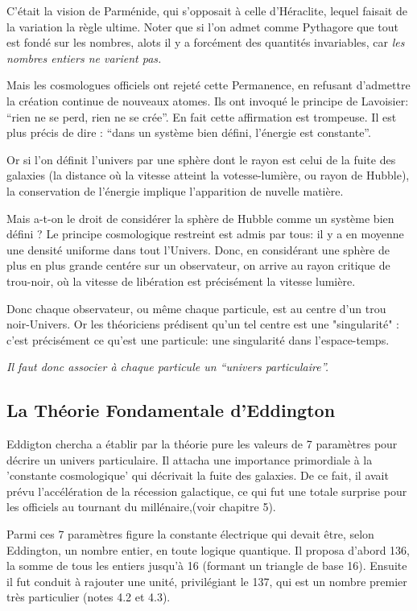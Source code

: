 \documentclass[a4paper,12pt]{article}
\begin{document}
C'était la vision de Parménide, qui s'opposait à celle d'Héraclite, lequel faisait de la variation la règle ultime. Noter que si l'on admet comme Pythagore que tout est fondé sur les nombres, alots il y a forcément des quantités invariables, car \textit{les nombres entiers ne varient pas.}

Mais les cosmologues officiels ont rejeté cette Permanence, en refusant d'admettre la création continue de nouveaux atomes. Ils ont invoqué le principe de Lavoisier: ``rien ne se perd, rien ne se crée''. En fait cette affirmation est trompeuse. Il est plus précis de dire : ``dans un système bien défini, l'énergie est constante''. 

Or si l'on définit l'univers par une sphère dont le rayon est celui de la fuite des galaxies (la distance où la vitesse atteint la votesse-lumière, ou rayon de Hubble), la conservation de l'énergie implique l'apparition de nuvelle matière. 

Mais a-t-on le droit de considérer la sphère de Hubble comme un système bien défini ? Le principe cosmologique restreint est admis par tous: il y a en moyenne une densité uniforme dans tout l'Univers. Donc, en considérant une sphère de plus en plus grande centére sur un observateur, on arrive au rayon critique de trou-noir, où la vitesse de libération est précisément la vitesse lumière. 

Donc chaque observateur, ou même chaque particule, est au centre d'un trou noir-Univers. Or les théoriciens prédisent qu'un tel centre est une "singularité" : c'est précisément ce qu'est une particule: une singularité dans l'espace-temps.

\textit{Il faut donc associer à chaque particule un ``univers particulaire''.}

\subsection{La Théorie Fondamentale d'Eddington}

Eddigton chercha a établir par la théorie pure les valeurs de 7 paramètres pour décrire un univers particulaire. Il attacha une importance primordiale à la 'constante cosmologique' qui décrivait la fuite des galaxies. De ce fait, il avait prévu l'accélération de la récession galactique, ce qui fut une totale surprise pour les officiels au tournant du millénaire,(voir chapitre 5). 

Parmi ces 7 paramètres figure la constante électrique qui devait être, selon Eddington, un nombre entier, en toute logique quantique. Il proposa d'abord 136, la somme de tous les entiers jusqu'à 16 (formant un triangle de base 16). Ensuite il fut conduit à rajouter une unité, privilégiant le 137, qui est un nombre premier très particulier (notes 4.2 et 4.3).
\end{document}
